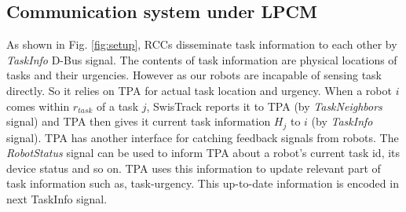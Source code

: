 \subsection{Communication system under LPCM}
As shown in Fig. \ref{fig:setup}, RCCs disseminate task information to each other by \textit{TaskInfo} D-Bus signal. The contents of task information are physical locations of tasks and their urgencies. However as our robots are incapable of sensing task directly. So it relies on TPA for actual task location and urgency. When a robot $i$ comes within $r_{task}$ of a task $j$, SwisTrack reports it to TPA (by {\em TaskNeighbors} signal) and TPA then gives it current task information $H_j$ to $i$ (by {\em TaskInfo} signal).
TPA has another interface for catching feedback signals from robots. The \textit{RobotStatus} signal can be used to inform TPA about a robot's current task id, its device status and so on. TPA uses this information to update relevant part of task information such as, task-urgency. This up-to-date information is encoded in next TaskInfo signal.\\
